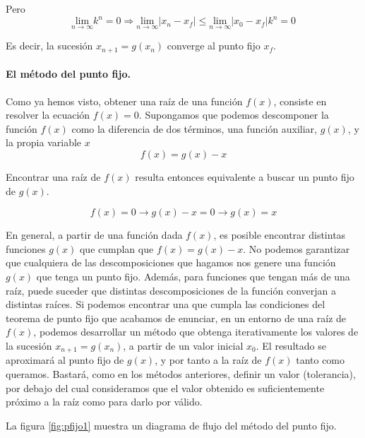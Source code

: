 Pero
\begin{equation*}
\underset{n\rightarrow \infty}{\text{lim}}k^n=0 \Rightarrow \underset{n\rightarrow \infty}{\text{lim}} \vert x_n-x_f \vert \leq \underset{n\rightarrow \infty}{\text{lim}}\vert x_0-x_f \vert k^n =0
\end{equation*} 

Es decir, la sucesión  $x_{n+1}=g(x_n)$ converge al punto fijo $x_f$.


\paragraph{El método del punto fijo.} Como ya hemos visto, obtener una raíz de una función $f(x)$, consiste en resolver la ecuación $f(x)=0$. Supongamos que podemos descomponer la función $f(x)$ como la diferencia de dos términos, una función auxiliar, $g(x)$, y la propia variable $x$
\begin{equation*}
f(x)=g(x)-x
\end{equation*}

Encontrar una raíz de $f(x)$ resulta entonces equivalente a buscar un punto fijo de $g(x)$. 

\begin{equation*}
f(x)=0 \rightarrow g(x)-x=0 \rightarrow g(x)=x
\end{equation*}

En general, a partir de una función dada $f(x)$, es posible encontrar distintas funciones $g(x)$ que cumplan que $f(x)=g(x)-x$. No podemos garantizar que cualquiera de las descomposiciones que hagamos nos genere una función $g(x)$ que tenga un punto fijo. 
Además, para funciones que tengan más de una raíz, puede suceder que distintas descomposiciones de la función converjan a distintas raíces.
Si podemos encontrar una que cumpla las condiciones del teorema de punto fijo que acabamos de enunciar, en un entorno de una raíz de $f(x)$, podemos desarrollar un método que obtenga iterativamente los valores de la sucesión   $x_{n+1}=g(x_n)$, a partir de un valor inicial $x_0$.  El resultado se aproximará al punto fijo de $g(x)$, y por tanto a la raíz de $f(x)$ tanto como queramos. Bastará, como   en los métodos anteriores, definir un valor (tolerancia), por debajo del cual consideramos que el valor obtenido es suficientemente próximo a  la raíz como para darlo por válido. 

La figura \ref{fig:pfijo1} muestra un diagrama de flujo del método del punto fijo. 


